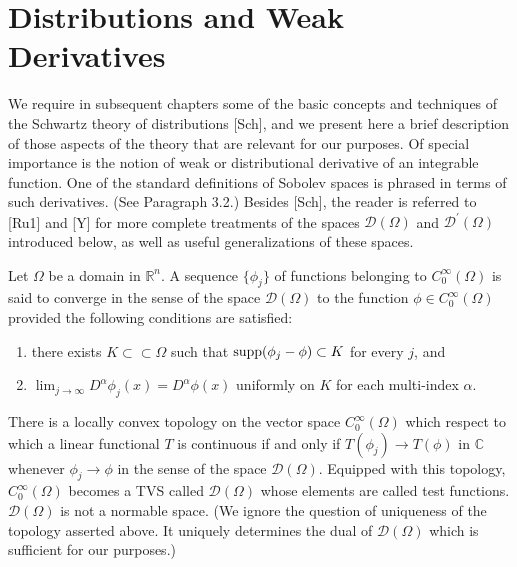 \section{Distributions and Weak Derivatives}

\begin{para}
  We require in subsequent chapters some of the basic concepts and techniques of the Schwartz theory of distributions [Sch], and we present here a brief description of those aspects of the theory that are relevant for our purposes. Of special importance is the notion of weak or distributional derivative of an integrable function. One of the standard definitions of Sobolev spaces is phrased in terms of such derivatives. (See Paragraph 3.2.) Besides [Sch], the reader is referred to [Ru1] and [Y] for more complete treatments of the spaces $\mathscr{D}(\Omega)$ and $\mathscr{D}^{\prime}(\Omega)$ introduced below, as well as useful generalizations of these spaces.
\end{para}

\begin{para}
  Let $\Omega$ be a domain in $\mathbb{R}^n$. A sequence $\{\phi_j\}$ of functions belonging to $C_0^{\infty}(\Omega)$ is said to converge in the sense of the space $\mathscr{D}(\Omega)$ to the function $\phi \in C_0^{\infty}(\Omega)$ provided the following conditions are satisfied:
  \begin{enumerate}[label = (\roman*)]
    \item there exists $K \subset\subset \Omega$ such that $\operatorname{supp}(\phi_j-\phi) \subset K$ for every $j$, and
    \item $\lim _{j \rightarrow \infty} D^\alpha \phi_j(x)=D^\alpha \phi(x)$ uniformly on $K$ for each multi-index $\alpha$.
  \end{enumerate}
  There is a locally convex topology on the vector space $C_0^{\infty}(\Omega)$ which respect to 
  which a linear functional $T$ is continuous if and only if $T(\phi_j) \rightarrow T(\phi)$ in 
  $\mathbb{C}$ whenever $\phi_j \rightarrow \phi$ in the sense of the space $\mathscr{D}(\Omega)$. 
  Equipped with this topology, $C_0^{\infty}(\Omega)$ becomes a TVS called $\mathscr{D}(\Omega)$ 
  whose elements are called test functions. $\mathscr{D}(\Omega)$ is not a normable space.
  (We ignore the question of uniqueness of the topology asserted above.
  It uniquely determines the dual of $\mathscr{D}(\Omega)$ which is sufficient for our purposes.)
\end{para}


